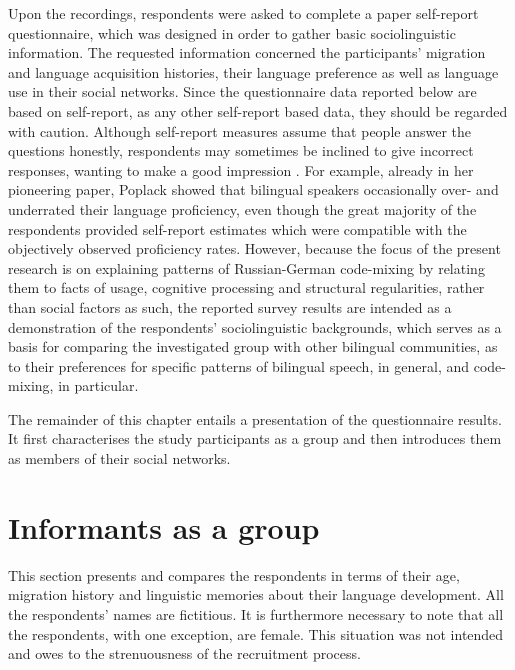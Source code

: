 Upon the recordings, respondents were asked to complete a paper self-report questionnaire, which was designed in order to gather basic sociolinguistic information. The requested information concerned the participants' migration and language acquisition histories, their language preference as well as language use in their social networks. Since the questionnaire data reported below are based on self-report, as any other self-report based data, they should be regarded with caution. Although self-report measures assume that people answer the questions honestly, respondents may sometimes be inclined to give incorrect responses, wanting to make a good impression \citep[cf.][208]{social-psychology}. For example, already in her \citeyear{poplack-sometimes-1980} pioneering paper, Poplack showed that bilingual speakers occasionally over- and underrated their language proficiency, even though the great majority of the respondents provided self-report estimates which were compatible with the objectively observed proficiency rates. However, because the focus of the present research is on explaining patterns of Russian-German code-mixing by relating them to facts of usage, cognitive processing and structural regularities, rather than social factors as such, the reported survey results are intended as a demonstration of the respondents' sociolinguistic backgrounds, which serves as a basis for comparing the investigated group with other bilingual communities, as to their preferences for specific patterns of bilingual speech, in general, and code-mixing, in particular.

The remainder of this chapter entails a presentation of the questionnaire results. It first characterises the study participants as a group and then introduces them as members of their social networks.

\section{Informants as a group}
This section presents and compares the respondents in terms of their age, migration history and linguistic memories about their language development. All the respondents' names are fictitious. It is furthermore necessary to note that all the respondents, with one exception, are female. This situation was not intended and owes to the strenuousness of the recruitment process.

